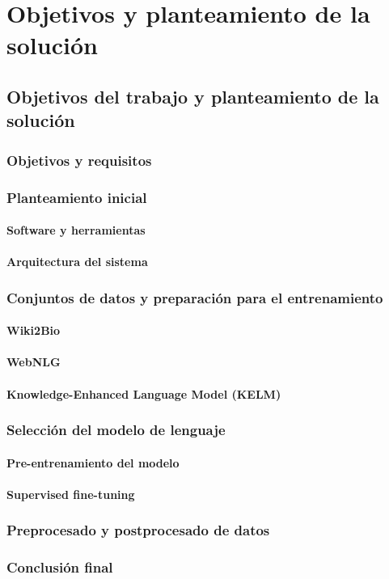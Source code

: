 \chapter{Objetivos y planteamiento de la solución}
\label{cap:descripcionTrabajo}

\section{Objetivos del trabajo y planteamiento de la solución}
\subsection{Objetivos y requisitos}
\subsection{Planteamiento inicial}
\subsubsection{Software y herramientas}
\subsubsection{Arquitectura del sistema}
\subsection{Conjuntos de datos y preparación para el entrenamiento}
\subsubsection{Wiki2Bio}
\subsubsection{WebNLG}
\subsubsection{Knowledge-Enhanced Language Model (KELM)}
\subsection{Selección del modelo de lenguaje}
\subsubsection{Pre-entrenamiento del modelo}
\subsubsection{Supervised fine-tuning}
\subsection{Preprocesado y postprocesado de datos}
\subsection{Conclusión final}
